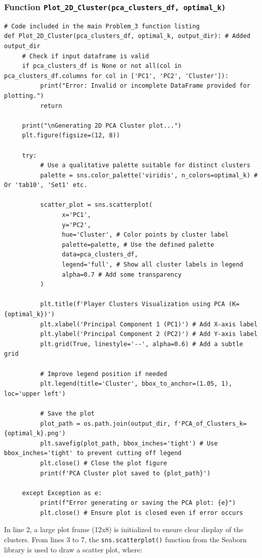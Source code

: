 \documentclass[12pt]{report}
\begin{document}
{{{\subsubsection{Function \texttt{Plot\_2D\_Cluster(pca\_clusters\_df, optimal\_k)}} %
\begin{lstlisting}
# Code included in the main Problem_3 function listing
def Plot_2D_Cluster(pca_clusters_df, optimal_k, output_dir): # Added output_dir
     # Check if input dataframe is valid
     if pca_clusters_df is None or not all(col in pca_clusters_df.columns for col in ['PC1', 'PC2', 'Cluster']):
          print("Error: Invalid or incomplete DataFrame provided for plotting.")
          return

     print("\nGenerating 2D PCA Cluster plot...")
     plt.figure(figsize=(12, 8))

     try:
          # Use a qualitative palette suitable for distinct clusters
          palette = sns.color_palette('viridis', n_colors=optimal_k) # Or 'tab10', 'Set1' etc.

          scatter_plot = sns.scatterplot(
                x='PC1',
                y='PC2',
                hue='Cluster', # Color points by cluster label
                palette=palette, # Use the defined palette
                data=pca_clusters_df,
                legend='full', # Show all cluster labels in legend
                alpha=0.7 # Add some transparency
          )

          plt.title(f'Player Clusters Visualization using PCA (K={optimal_k})')
          plt.xlabel('Principal Component 1 (PC1)') # Add X-axis label
          plt.ylabel('Principal Component 2 (PC2)') # Add Y-axis label
          plt.grid(True, linestyle='--', alpha=0.6) # Add a subtle grid

          # Improve legend position if needed
          plt.legend(title='Cluster', bbox_to_anchor=(1.05, 1), loc='upper left')

          # Save the plot
          plot_path = os.path.join(output_dir, f'PCA_of_Clusters_k={optimal_k}.png')
          plt.savefig(plot_path, bbox_inches='tight') # Use bbox_inches='tight' to prevent cutting off legend
          plt.close() # Close the plot figure
          print(f'PCA Cluster plot saved to {plot_path}')

     except Exception as e:
          print(f"Error generating or saving the PCA plot: {e}")
          plt.close() # Ensure plot is closed even if error occurs

\end{lstlisting}
In line 2, a large plot frame (12x8) is initialized to ensure clear display of the clusters. From lines 3 to 7, the \texttt{sns.scatterplot()} function from the Seaborn library is used to draw a scatter plot, where:

}}}
\end{document}
